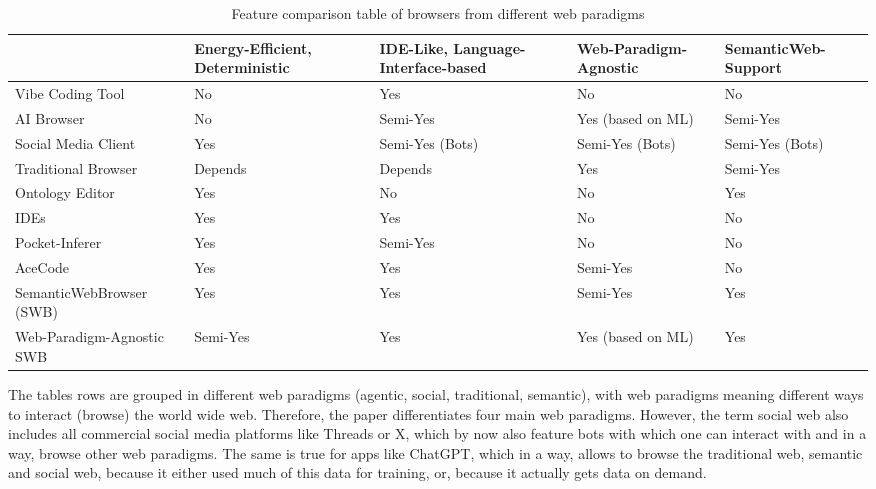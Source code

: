 \documentclass[12pt,a4paper]{article}
\begin{document}
\begin{table}[h]
    \centering
    \begin{tabular}{|l|p{2.5cm}|p{2.5cm}|p{2.5cm}|p{2.5cm}|}
    \hline
     & Energy-Efficient, Deterministic & IDE-Like, Language-Interface-based & Web-Paradigm-Agnostic & SemanticWeb-Support \\
     \hline
    Vibe Coding Tool & \cellcolor{red!25} No & \cellcolor{green} Yes & \cellcolor{red!25} No & \cellcolor{red!25} No \\
     \hline
    AI Browser & \cellcolor{red!25} No & \cellcolor{yellow} Semi-Yes & \cellcolor{green} Yes (based on ML) & \cellcolor{yellow} Semi-Yes \\
    \hline
    Social Media Client & \cellcolor{green} Yes & \cellcolor{yellow} Semi-Yes (Bots) & \cellcolor{yellow} Semi-Yes (Bots) & \cellcolor{yellow} Semi-Yes (Bots) \\
    \hline
    Traditional Browser & \cellcolor{gray!25} Depends & \cellcolor{gray!25} Depends & \cellcolor{green} Yes & \cellcolor{yellow} Semi-Yes \\
    \hline
    Ontology Editor & \cellcolor{green} Yes & \cellcolor{red!25} No & \cellcolor{red!25} No & \cellcolor{green} Yes \\
    \hline
    IDEs & \cellcolor{green} Yes & \cellcolor{green} Yes & \cellcolor{red!25} No & \cellcolor{red!25} No \\
    \hline
    Pocket-Inferer & \cellcolor{green} Yes & \cellcolor{yellow} Semi-Yes & \cellcolor{red!25} No & \cellcolor{red!25} No \\
    \hline
    AceCode & \cellcolor{green} Yes & \cellcolor{green} Yes & \cellcolor{yellow} Semi-Yes & \cellcolor{red!25} No \\
    \hline
    SemanticWebBrowser (SWB) & \cellcolor{green} Yes & \cellcolor{green} Yes & \cellcolor{yellow}Semi-Yes & \cellcolor{green}Yes \\
    \hline
    Web-Paradigm-Agnostic SWB & \cellcolor{yellow} Semi-Yes & \cellcolor{green}Yes & \cellcolor{green}Yes (based on ML) & \cellcolor{green}Yes \\
    \hline
    \end{tabular}
    \caption{Feature comparison table of browsers from different web paradigms}
    \label{tab:features}
\end{table}

The tables rows are grouped in different web paradigms (agentic, social, traditional, semantic), with web paradigms meaning different ways to interact (browse) the world wide web.
Therefore, the paper differentiates four main web paradigms.
However, the term social web also includes all commercial social media platforms like Threads or X, which by now also feature bots with which one can interact with and in a way, browse other web paradigms.
The same is true for apps like ChatGPT, which in a way, allows to browse the traditional web, semantic and social web, because it either used much of this data for training, or, because it actually gets data on demand.
\end{document}
